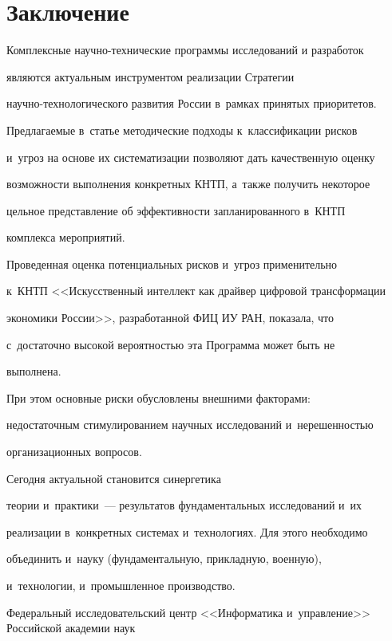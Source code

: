  

\section{Заключение }



    Комплексные научно-технические программы исследований и разработок

являются актуальным инструментом реализации Стратегии 

научно-тех\-но\-ло\-ги\-че\-ско\-го развития России в~рамках принятых приоритетов. 

Пред\-ла\-га\-емые в~\mbox{статье} методические подходы к~классификации рисков 

и~угроз на основе их систематизации позволяют дать качественную оценку 

возможности выполнения конкретных КНТП, а~также получить некоторое 

цельное представление об эффективности запланированного в~КНТП 

комплекса мероприятий. 

    

    Проведенная оценка потенциальных рисков и~угроз применительно 

к~КНТП <<Искусственный интеллект как драйвер цифровой трансформации 

экономики России>>, разработанной ФИЦ ИУ РАН, показала, что 

с~достаточно высокой вероятностью эта Программа может быть не 

выполнена. 


    При этом основные риски обусловлены внешними факторами: 

недостаточным стимулированием научных исследований и~нерешенностью 

организационных вопросов.



 Сегодня актуальной становится синергетика 

теории и~практики~--- результатов фундаментальных исследований и~их 

реализации в~конкретных системах и~технологиях. Для этого необходимо 

объединить и~науку (фундаментальную, прикладную, военную), 

и~технологии, и~промышленное производство. 

    

    Федеральный исследовательский центр <<Информатика и~управ\-ле\-ние>> Российской академии наук

